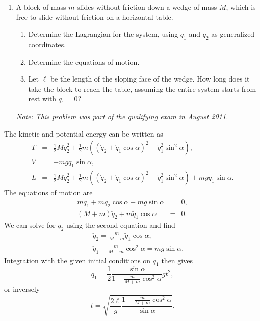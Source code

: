 \documentclass[letterpaper,11pt]{article}
\begin{document}
\begin{enumerate}[resume]
 \item A block of mass $m$ slides without friction down a wedge of mass $M$, which is free to slide without friction on a horizontal table.
 \begin{enumerate}
  \item Determine the Lagrangian for the system, using $q_1$ and $q_2$ as generalized coordinates.
  \item Determine the equations of motion.
  \item Let $\ell$ be the length of the sloping face of the wedge.  How long does it take the block to reach the table, assuming the entire system starts from rest with $q_1 = 0$?
 \end{enumerate}
 \textit{Note: This problem was part of the qualifying exam in August 2011.}
 \begin{center}
 \end{center}
\end{enumerate}
The kinetic and potential energy can be written as
\begin{eqnarray*}
 T & = & \frac{1}{2} M \dot{q}_2^2 + \frac{1}{2} m \left( (\dot{q}_2 + \dot{q}_1\cos\alpha)^2 + \dot{q}_1^2 \sin^2\alpha \right), \\
 V & = & - m g q_1 \sin\alpha, \\
 L & = & \frac{1}{2} M \dot{q}_2^2 + \frac{1}{2} m \left( (\dot{q}_2 + \dot{q}_1\cos\alpha)^2 + \dot{q}_1^2 \sin^2\alpha \right) + m g q_1 \sin\alpha.
\end{eqnarray*}
The equations of motion are
\begin{eqnarray*}
 m\ddot{q}_1 + m\ddot{q}_2 \cos\alpha - mg \sin\alpha & = & 0, \\
 (M + m) \ddot{q}_2 + m\ddot{q}_1 \cos\alpha & = & 0.
\end{eqnarray*}
We can solve for $\ddot{q}_2$ using the second equation and find
\begin{eqnarray*}
 & & \ddot{q}_2 = \frac{m}{M + m} \ddot{q}_1 \cos\alpha, \\
 & & \ddot{q}_1 + \frac{m}{M + m} \cos^2\alpha = mg \sin\alpha.
\end{eqnarray*}
Integration with the given initial conditions on $q_1$ then gives
\begin{equation*}
 q_1 = \frac{1}{2} \frac{\sin\alpha}{1 - \frac{m}{M + m} \cos^2\alpha} g t^2,
\end{equation*}
or inversely
\begin{equation*}
 t = \sqrt{\frac{2\ell}{g} \frac{1 - \frac{m}{M + m} \cos^2\alpha}{\sin\alpha}}.
\end{equation*}
\end{document}
